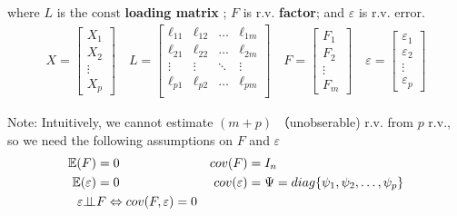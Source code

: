     where $ L $ is the $ \mathrm{const} $ \textbf{loading matrix} ; $ F $ is r.v. \textbf{factor}; and $ \varepsilon  $ is r.v. error.
    \begin{align*}
        X=\begin{bmatrix}
            X_1\\X_2\\\vdots\\X_p
        \end{bmatrix}\quad
        L=\begin{bmatrix}
        \ell_{11}&\ell_{12}&\ldots&\ell_{1m}\\
        \ell_{21}&\ell_{22}&\ldots&\ell_{2m}\\
        \vdots&\vdots&\ddots&\vdots\\
        \ell_{p1}&\ell_{p2}&\ldots&\ell_{pm}\\
        \end{bmatrix}\quad
        F=\begin{bmatrix}
            F_1\\F_2\\\vdots\\F_m
        \end{bmatrix}
        \quad
        \varepsilon =\begin{bmatrix}
            \varepsilon _1\\\varepsilon _2\\\vdots\\\varepsilon _p
        \end{bmatrix}
    \end{align*}

    Note: Intuitively, we cannot estimate $ (m+p) $ （unobserable) r.v. from $ p $ r.v., so we need the following assumptions on $ F $ and $ \varepsilon  $
    \begin{equation}
        \begin{aligned}
            \mathbb{E}(F)&=0&cov(F)&=I_n\\
            \mathbb{E}(\varepsilon )&=0&cov(\varepsilon )&=\Psi =diag\{\psi _1,\psi _2,\ldots ,\psi _p\}\\
            \varepsilon \bot\!\!\!\bot& F\Leftrightarrow cov(F,\varepsilon )=0&&
        \end{aligned}
    \end{equation}

